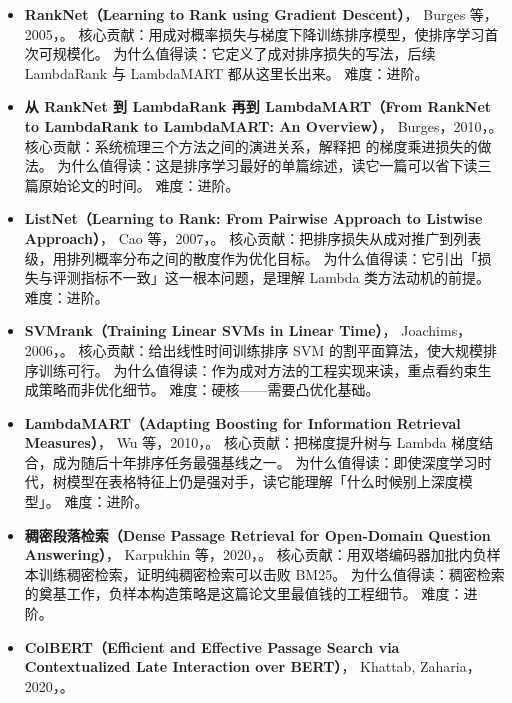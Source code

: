 \begin{itemize}
        为什么值得读：伪相关反馈的思想源头，在今天的稠密检索查询扩展中仍在以新形式复现。
        难度：进阶。
  \item \textbf{RankNet（Learning to Rank using Gradient Descent）}，
        Burges 等，2005，\cite{burges2005ranknet}。
        核心贡献：用成对概率损失与梯度下降训练排序模型，使排序学习首次可规模化。
        为什么值得读：它定义了成对排序损失的写法，后续 LambdaRank 与 LambdaMART 都从这里长出来。
        难度：进阶。
  \item \textbf{从 RankNet 到 LambdaRank 再到 LambdaMART（From RankNet to LambdaRank to LambdaMART: An Overview）}，
        Burges，2010，\cite{burges2010ranknet}。
        核心贡献：系统梳理三个方法之间的演进关系，解释把  的梯度乘进损失的做法。
        为什么值得读：这是排序学习最好的单篇综述，读它一篇可以省下读三篇原始论文的时间。
        难度：进阶。
  \item \textbf{ListNet（Learning to Rank: From Pairwise Approach to Listwise Approach）}，
        Cao 等，2007，\cite{cao2007listnet}。
        核心贡献：把排序损失从成对推广到列表级，用排列概率分布之间的散度作为优化目标。
        为什么值得读：它引出「损失与评测指标不一致」这一根本问题，是理解 Lambda 类方法动机的前提。
        难度：进阶。
  \item \textbf{SVMrank（Training Linear SVMs in Linear Time）}，
        Joachims，2006，\cite{joachims2006svmrank}。
        核心贡献：给出线性时间训练排序 SVM 的割平面算法，使大规模排序训练可行。
        为什么值得读：作为成对方法的工程实现来读，重点看约束生成策略而非优化细节。
        难度：硬核——需要凸优化基础。
  \item \textbf{LambdaMART（Adapting Boosting for Information Retrieval Measures）}，
        Wu 等，2010，\cite{wu2010lambdamart}。
        核心贡献：把梯度提升树与 Lambda 梯度结合，成为随后十年排序任务最强基线之一。
        为什么值得读：即使深度学习时代，树模型在表格特征上仍是强对手，读它能理解「什么时候别上深度模型」。
        难度：进阶。
  \item \textbf{稠密段落检索（Dense Passage Retrieval for Open-Domain Question Answering）}，
        Karpukhin 等，2020，\cite{karpukhin2020dpr}。
        核心贡献：用双塔编码器加批内负样本训练稠密检索，证明纯稠密检索可以击败 BM25。
        为什么值得读：稠密检索的奠基工作，负样本构造策略是这篇论文里最值钱的工程细节。
        难度：进阶。
  \item \textbf{ColBERT（Efficient and Effective Passage Search via Contextualized Late Interaction over BERT）}，
        Khattab, Zaharia，2020，\cite{khattab2020colbert}。

\end{itemize}
